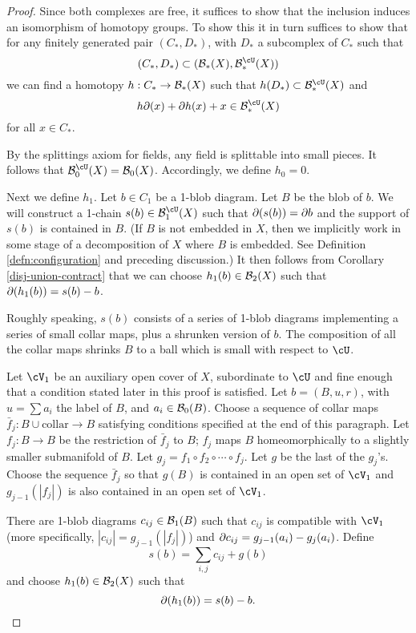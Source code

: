 \begin{proof}
Since both complexes are free, it suffices to show that the inclusion induces
an isomorphism of homotopy groups.
To show this it in turn suffices to show that for any finitely generated 
pair $(C_*, D_*)$, with $D_*$ a subcomplex of $C_*$ such that 
\[
	(C_*, D_*) \sub (\bc_*(X), \sbc_*(X))
\]
we can find a homotopy $h:C_*\to {\mathcal B}_*(X)$ such that $h(D_*) \sub \sbc_*(X)$
and
\[
	h\bd(x) + \bd h(x) + x \in \sbc_*(X)
\]
for all $x\in C_*$.

By the splittings axiom for fields, any field is splittable into small pieces.
It follows that $\sbc_0(X) = \bc_0(X)$.
Accordingly, we define $h_0 = 0$.

Next we define $h_1$.
Let $b\in C_1$ be a 1-blob diagram.
Let $B$ be the blob of $b$.
We will construct a 1-chain $s(b)\in \sbc_1(X)$ such that $\partial(s(b)) = \partial b$
and the support of $s(b)$ is contained in $B$.
(If $B$ is not embedded in $X$, then we implicitly work in some stage of a decomposition
of $X$ where $B$ is embedded.
See Definition \ref{defn:configuration} and preceding discussion.)
It then follows from Corollary \ref{disj-union-contract} that we can choose
$h_1(b) \in {\mathcal B}_2(X)$ such that $\partial(h_1(b)) = s(b) - b$.

Roughly speaking, $s(b)$ consists of a series of 1-blob diagrams implementing a series
of small collar maps, plus a shrunken version of $b$.
The composition of all the collar maps shrinks $B$ to a ball which is small with respect to $\cU$.

Let $\cV_1$ be an auxiliary open cover of $X$, subordinate to $\cU$ and 
fine enough that a condition stated later in this proof is satisfied.
Let $b = (B, u, r)$, with $u = \sum a_i$ the label of $B$, and $a_i\in {\mathcal B}_0(B)$.
Choose a sequence of collar maps $\bar{f}_j:B\cup\text{collar}\to B$ satisfying conditions 
specified at the end of this paragraph.
Let $f_j:B\to B$ be the restriction of $\bar{f}_j$ to $B$; $f_j$ maps $B$ homeomorphically to 
a slightly smaller submanifold of $B$.
Let $g_j = f_1\circ f_2\circ\cdots\circ f_j$.
Let $g$ be the last of the $g_j$'s.
Choose the sequence $\bar{f}_j$ so that 
$g(B)$ is contained in an open set of $\cV_1$ and
$g_{j-1}(|f_j|)$ is also contained in an open set of $\cV_1$.

There are 1-blob diagrams $c_{ij} \in {\mathcal B}_1(B)$ such that $c_{ij}$ is compatible with $\cV_1$
(more specifically, $|c_{ij}| = g_{j-1}(|f_j|)$)
and $\partial c_{ij} = g_{j-1}(a_i) - g_{j}(a_i)$.
Define
\[
	s(b) = \sum_{i,j} c_{ij} + g(b)
\]
and choose $h_1(b) \in {\mathcal B}_2(X)$ such that 
\[
	\partial(h_1(b)) = s(b) - b .
\]


\end{proof}
